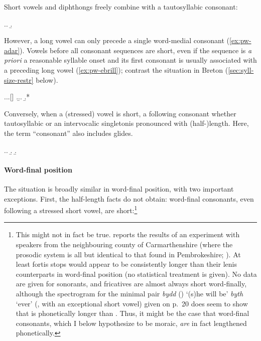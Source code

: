 Short vowels and diphthongs freely combine with a tautosyllabic consonant:

\ex.\a.
\b.

However, a long vowel can only precede a single word-medial consonant (\cref{ex:pw-adar}). Vowels before all consonant sequences are short, even if the sequence is \emph{a priori} a reasonable syllable onset and its first consonant is usually associated with a preceding long vowel (\cref{ex:pw-ebrill}); contrast the situation in Breton (\cref{sec:syll-size-restr} below).

\ex.\a.\label{ex:pw-adar}\a.[]
\z.\b.\label{ex:pw-ebrill}\a.
\b.*\mbi{[ˈeːbriɬ]}

Conversely, when a (stressed) vowel is short, a following consonant \dash whether tautosyllabic or an intervocalic singleton\dash is pronounced with (half-)\hspace{0pt}length. Here, the term \enquote{consonant} also includes glides.

\ex.\a.
\b.
\b.


\paragraph{Word-final position}
\label{sec:word-final-position-1}

The situation is broadly similar in word-final position, with two important exceptions. First, the half-length facts do not obtain: word-final consonants, even following a stressed short vowel, are short:\footnote{\label{fn:final-consonant-length}This might not in fact be true. \citet{ball-phon} reports the results of an experiment with speakers from the neighbouring county of Carmarthenshire (where the prosodic system is all but identical to that found in Pembrokeshire; \citealt{thorne93:_compr_welsh_gramm,awbery86:_pembr_welsh,jones92:_dyfed}). At least  fortis stops would appear to be consistently longer than their lenis counterparts in word-final position (no statistical treatment is given). No data are given for sonorants, and fricatives are almost always short word-finally, although the spectrogram for the minimal pair \emph{bydd} (\ipa{[ˈbiːð]}) `(s)he will be' \vs \emph{byth} `ever' (\ipa{[ˈbiθ]}, with an exceptional short vowel) given on p.~20 does seem to show that \ipa{[θ]} is phonetically longer than \ipa{[ð]}. Thus, it might be the case that word-final consonants, which I below hypothesize to be moraic, \emph{are} in fact lengthened phonetically.}

